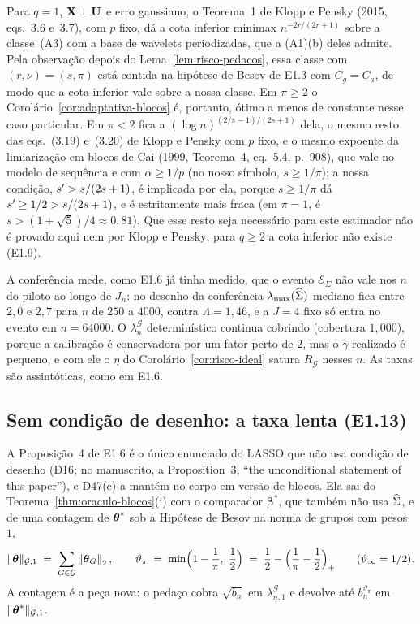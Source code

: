 \documentclass[11pt,a4paper]{article}
\newcommand{\lmaxx}{\lambda_{\max}}
\newcommand{\bbeta}{\boldsymbol{\beta}}
\newcommand{\betastar}{\bbeta^{*}}
\newcommand{\gtil}{\widetilde{\gamma}}
\newcommand{\Gcal}{\mathcal{G}}
\newcommand{\bn}{b_{n}}
\newcommand{\nGone}[1]{\lVert #1\rVert_{\mathcal{G},1}}
\newcommand{\Rid}{R_{\mathcal{G}}}
\newcommand{\lamG}{\lambda^{\mathcal{G}}_{n}}
\newcommand{\lamGone}{\lambda^{\mathcal{G}}_{n,1}}
\newcommand{\ESig}{\mathcal{E}_{\Sigma}}
\begin{document}
\begin{remark}[a cota inferior de Klopp e Pensky em $q = 1$]\label{rem:inferior}
Para $q = 1$, $\mathbf{X} \perp \mathbf{U}$ e erro gaussiano, o Teorema~1 de Klopp e Pensky
(2015, eqs.~3.6 e~3.7), com $p$ fixo, dá a cota inferior minimax
$n^{-2r/(2r+1)}$ sobre a classe~(A3) com a base de wavelets periodizadas, que
a (A1)(b) deles admite. Pela observação depois do
Lema~\ref{lem:risco-pedacos}, essa classe com $(r,\nu) = (s,\pi)$ está contida
na hipótese de Besov de E1.3 com $C_{g} = C_{a}$, de modo que a cota inferior
vale sobre a nossa classe. Em $\pi \ge 2$ o
Corolário~\ref{cor:adaptativa-blocos} é, portanto, ótimo a menos de
constante nesse caso particular. Em $\pi < 2$ fica a
$(\log n)^{(2/\pi-1)/(2s+1)}$ dela, o mesmo resto das eqs.~(3.19) e~(3.20) de
Klopp e Pensky com $p$ fixo, e o mesmo expoente da limiarização em blocos de
Cai (1999, Teorema~4, eq.~5.4, p.~908), que vale no modelo de sequência e com
$\alpha \ge 1/p$ (no nosso símbolo, $s \ge 1/\pi$); a nossa condição,
$s' > s/(2s+1)$, é implicada por ela, porque $s \ge 1/\pi$ dá
$s' \ge 1/2 > s/(2s+1)$, e é estritamente mais fraca (em $\pi = 1$, é
$s > (1+\sqrt5)/4 \approx 0{,}81$). Que esse resto seja necessário para
este estimador não é provado aqui nem por Klopp e Pensky; para $q \ge 2$ a
cota inferior não existe (E1.9).
\end{remark}

\begin{remark}\label{rem:pre-blocos}
A conferência mede, como E1.6 já tinha medido, que o evento $\ESig$ não vale
nos $n$ do piloto ao longo de $J_{n}$: no desenho da conferência
$\lmaxx(\Gramhat)$ mediano fica entre $2{,}0$ e $2{,}7$ para $n$ de $250$ a
$4000$, contra $\Lambda = 1{,}46$, e a $J = 4$ fixo só entra no evento em
$n = 64000$. O $\lamG$ determinístico continua cobrindo (cobertura $1{,}000$),
porque a calibração é conservadora por um fator perto de $2$, mas o
$\gtil$ realizado é pequeno, e com ele o $\eta$ do
Corolário~\ref{cor:risco-ideal} satura $\Rid$ nesses $n$. As taxas são
assintóticas, como em E1.6.
\end{remark}

\subsection*{Sem condição de desenho: a taxa lenta (E1.13)}

A Proposição~4 de E1.6 é o único enunciado do LASSO que não usa condição de
desenho (D16; no manuscrito, a Proposition~3, ``the unconditional statement of
this paper''), e D47(c) a mantém no corpo em versão de blocos. Ela sai do
Teorema~\ref{thm:oraculo-blocos}(i) com o comparador $\betastar$, que também
não usa $\widehat{\Sigma}$, e de uma contagem de $\boldsymbol{\theta}^{*}$ sob a Hipótese de Besov
na norma de grupos com pesos~$1$,
\[
  \nGone{\btheta} \;=\; \sum_{G\in\Gcal}\norm{\btheta_{G}}_{2},
  \qquad
  \vartheta_{\pi} \;=\; \min\Bigl(1 - \frac{1}{\pi},\ \frac12\Bigr)
  \;=\; \frac12 - \Bigl(\frac1\pi - \frac12\Bigr)_{+}
  \qquad (\vartheta_{\infty} = 1/2).
\]
A contagem é a peça nova: o pedaço cobra $\sqrt{\bn}$ em $\lamGone$ e devolve
até $\bn^{\vartheta_{\pi}}$ em $\nGone{\thetastar}$.
\end{document}
